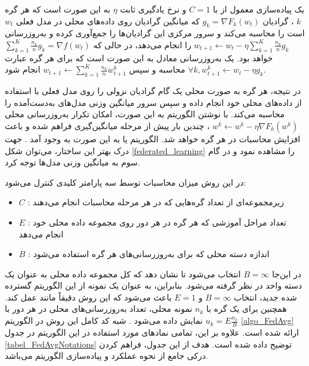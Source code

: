 یک پیاده‌سازی معمول از
با
$C = 1$
و نرخ یادگیری ثابت
$\eta$
به این صورت است که هر گره
$k$%
، گرادیان
$g_k=\nabla F_k\left(w_t\right)$
که میانگین گرادیان روی داده‌های محلی در مدل فعلی
$w_t$
است را محاسبه می‌کند و سرور مرکزی این گرادیان‌ها را جمع‌آوری کرده و به‌روزرسانی
$w_{t+1} \leftarrow w_t-\eta \sum_{k=1}^K \frac{n_k}{n} g_k$
را انجام می‌دهد، در حالی که
$\sum_{k=1}^K \frac{n_k}{n} g_k=\nabla f\left(w_t\right)$
خواهد بود. یک به‌روزرسانی معادل به این صورت است که برای هر گره عبارت
$\forall k, w_{t+1}^k \leftarrow w_t-\eta g_k$
محاسبه و سپس
$w_{t+1} \leftarrow \sum_{k=1}^K \frac{n_k}{n} w_{t+1}^k$
انجام شود.

در نتیجه، هر گره به صورت محلی یک گام گرادیان نزولی را روی مدل فعلی با استفاده از داده‌های محلی خود انجام داده و سپس سرور میانگین وزنی مدل‌های به‌دست‌آمده را محاسبه می‌کند. با نوشتن الگوریتم به این صورت، امکان تکرار به‌روزرسانی محلی
$w^k \leftarrow w^k-\eta \nabla F_k\left(w^k\right)$%
، چندین بار پیش از مرحله میانگین‌گیری فراهم شده و باعث افزایش محاسبات در هر گره خواهد شد. الگوریتم
یا
به این صورت به وجود آمد
\cite{mcmahan2017communication}.
جهت درک بهتر این ساختار، می‌توان شکل 
\ref{federated_learning} 
را مشاهده نمود و در گام سوم به میانگین وزنی مدل‌ها توجه کرد.

در این روش میزان محاسبات توسط سه پارامتر کلیدی کنترل می‌شود:
\begin{itemize}
	\item
	$C$%
: زیرمجموعه‌ای از تعداد گره‌هایی که در هر مرحله محاسبات انجام می‌دهند

	\item
	$E$%
: تعداد مراحل آموزشی که هر گره در هر دور روی مجموعه داده محلی خود انجام می‌دهد
	
	\item
	$B$%
: اندازه دسته محلی که برای به‌روزرسانی‌های هر گره استفاده می‌شود
	
\end{itemize}
در این‌جا
$B = \infty$
انتخاب می‌شود تا نشان دهد که کل مجموعه داده محلی به عنوان یک دسته واحد در نظر گرفته می‌شود. بنابراین، به عنوان یک نمونه از این الگوریتم گسترده شده جدید، انتخاب
$B = \infty$
و
$E = 1$
باعث می‌شود که این روش دقیقاً مانند
عمل کند. همچنین برای یک گره با
$n_k$
نمونه محلی، تعداد به‌روزرسانی‌های محلی در هر دور با
$u_k=E \frac{n_k}{B}$
نمایش داده می‌شود
\cite{mcmahan2017communication}.
شبه کد کامل این روش در الگوریتم
\ref{algo_FedAvg}
ارائه شده است. علاوه بر این، تمامی نمادهای مورد استفاده در این الگوریتم در جدول
\ref{tabel_FedAvgNotations}
توضیح داده شده است. هدف از این جدول، فراهم کردن درکی جامع از نحوه عملکرد و پیاده‌سازی الگوریتم می‌باشد.


